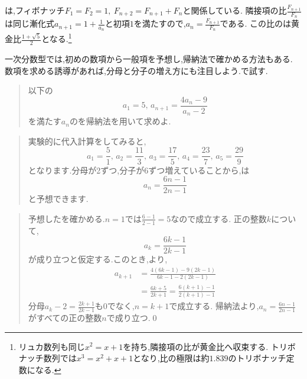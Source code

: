   は,フィボナッチ$F_1=F_2=1,\ F_{n+2}=F_{n+1}+F_n$と関係している.
  隣接項の比$\frac{F_{n+1}}{F_n}$は同じ漸化式$a_{n+1}=1+\frac{1}{a_n}$と初項$1$を満たすので,$a_n=\frac{F_{n+1}}{F_n}$である.
  この比のは黄金比$\frac{1+\sqrt5}{2}$となる.\footnote{リュカ数列も同じ$x^2=x+1$を持ち,隣接項の比が黄金比へ収束する.
    トリボナッチ数列では$x^3=x^2+x+1$となり,比の極限は約$1.839$のトリボナッチ定数になる.}

  一次分数型では,初めの数項から一般項を予想し,帰納法で確かめる方法もある.
  数項を求める誘導があれば,分母と分子の増え方にも注目しよう.\mbox{}で試す.\\
  \noindent{}\par\nobreak
  \begin{quote}
    以下の
    \[
      a_1=5,\, a_{n+1}=\frac{4a_{n}-9}{a_{n}-2}
    \]
    を満たす$a_n$のを帰納法を用いて求めよ.
  \end{quote}
  \begin{quote}
    実験的に代入計算をしてみると,
    \[
      a_1=\frac{5}{1},\,a_2=\frac{11}{3},\,a_3=\frac{17}{5},\,a_4=\frac{23}{7},\,a_5=\frac{29}{9}
    \]
    となります.分母が2ずつ,分子が6ずつ増えていることから,は
    \[
      a_n=\frac{6n-1}{2n-1}
    \]
    と予想できます.
  \end{quote}
  \begin{quote}
    予想したを確かめる.$n=1$では$\frac{6-1}{2-1}=5$なので成立する.
    正の整数$k$について,
    \[
      a_k=\frac{6k-1}{2k-1}
    \]
    が成り立つと仮定する.このとき,より,
    \begin{align*}
      a_{k+1}&=\frac{4(6k-1)-9(2k-1)}{6k-1-2(2k-1)}\\
      &=\frac{6k+5}{2k+1}
      =\frac{6(k+1)-1}{2(k+1)-1}
    \end{align*}
    分母$a_k-2=\frac{2k+1}{2k-1}$も0でなく,$n=k+1$で成立する.
    帰納法より,$a_n=\frac{6n-1}{2n-1}$がすべての正の整数$n$で成り立つ.\qed

  \end{quote}
